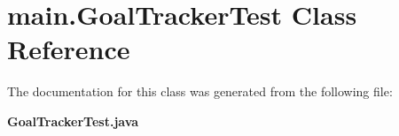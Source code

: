 \section{main.\+Goal\+Tracker\+Test Class Reference}
\label{classmain_1_1_goal_tracker_test}


The documentation for this class was generated from the following file\+:\begin{DoxyCompactItemize}
\item 
\textbf{ Goal\+Tracker\+Test.\+java}\end{DoxyCompactItemize}

